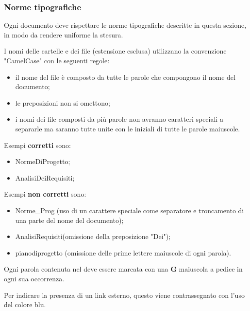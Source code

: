 \subsubsection{Norme tipografiche}
Ogni documento deve rispettare le norme tipografiche descritte in questa sezione, in modo da rendere uniforme la stesura.

I nomi delle cartelle e dei file (estensione esclusa) utilizzano la convenzione "CamelCase" con le seguenti regole:
\begin{itemize}
	\item il nome del file è composto da tutte le parole che compongono il nome del documento;
	\item le preposizioni non si omettono;
	\item i nomi dei file composti da più parole non avranno caratteri speciali a separarle ma saranno tutte unite con le iniziali di tutte le parole maiuscole.
\end{itemize}
Esempi \textbf{corretti} sono:
\begin{itemize}
	\item NormeDiProgetto;
	\item AnalisiDeiRequisiti;
\end{itemize}
Esempi \textbf{non corretti} sono:
\begin{itemize}
	\item Norme\_Prog (uso di un carattere speciale come separatore e troncamento di una parte del nome del documento);
	\item AnalisiRequisiti(omissione della preposizione "Dei");
		\item pianodiprogetto (omissione delle prime lettere maiuscole di ogni parola).
\end{itemize}

Ogni parola contenuta nel \Glossario{} deve essere marcata con una \textbf{G} maiuscola a pedice in ogni sua occorrenza.

Per indicare la presenza di un link esterno, questo viene contrassegnato con l'uso del colore blu.


